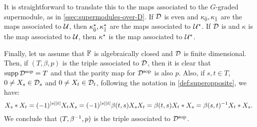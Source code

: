 It is straightforward to translate this to the maps associated to the $G$-graded supermodule, as in \cref{ssec:supermodules-over-D}. 
If $\mathcal{D}$ is even and $\kappa_{\bar{0}}, \kappa_{\bar{1}}$ are the maps associated to $\mathcal U$, then $\kappa_{\bar{0}}^\star, \kappa_{\bar{1}}^\star$ are the maps associated to $\mathcal U^\star$. 
If $\mathcal{D}$ is and $\kappa$ is the map associated to $\mathcal U$, then $\kappa^\star$ is the map associated to $\mathcal U^\star$.

Finally, let us assume that $\mathbb{F}$ is algebraically closed and $\mathcal{D}$ is finite dimensional. 
Then, if $(T, \beta, p)$ is the triple associated to $\mathcal{D}$, then it is clear that $\operatorname{supp} \mathcal{D}^{\mathrm{sop}} = T$ and that the parity map for $\mathcal{D}^{\mathrm{sop}}$ is also $p$. 
Also, if $s,t \in T$, $0 \neq X_s \in \mathcal{D}_s$ and $0 \neq X_t \in \mathcal{D}_t$, following the notation in \cref{def:superopposite}, we have:
\[
    X_s * X_t = (-1)^{|s||t|} X_tX_s = (-1)^{|s||t|} \beta(t, s) X_sX_t = \beta(t, s) X_t*X_s = \beta(s, t)^{-1} X_t*X_s.
\]
We conclude that $(T,\beta^{-1}, p)$ is the triple associated to $\mathcal{D}^{\mathrm{sop}}$.